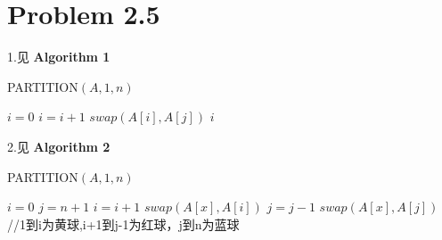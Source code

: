 \documentclass[twocolumn]{ctexart}
\begin{document}
\section*{Problem 2.5}
1.见 \textbf{Algorithm 1}
\begin{algorithm}[htbp]
	\caption{PARTITION$(A,1,n)$}
	\begin{algorithmic}[1]
		\STATE $i=0$
				\STATE $i=i+1$
				\STATE $swap(A[i],A[j])$
			\ENDIF
		\ENDFOR
		\RETURN $i$
	\end{algorithmic}
\end{algorithm}

2.见 \textbf{Algorithm 2}
\begin{algorithm}[htbp]
	\caption{PARTITION$(A,1,n)$}
	\begin{algorithmic}[1]
		\STATE $i=0$
		\STATE $j=n+1$
				\STATE $i=i+1$
				\STATE $swap(A[x],A[i])$
				\STATE $j=j-1$
				\STATE $swap(A[x],A[j])$
			\ENDIF
		\ENDFOR
		\RETURN
		\STATE //1到i为黄球,i+1到j-1为红球，j到n为蓝球
	\end{algorithmic}
\end{algorithm}
\end{document}
